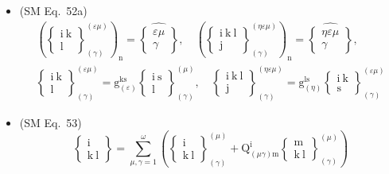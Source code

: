 \documentclass[
    12pt,              %
    a4paper,           %
    headings=normal,   %
    twoside=true,      %
    BCOR=8mm,          %
]{scrbook}
\begin{document}
\begin{itemize}[label={},leftmargin=0pt]
    \item (SM Eq.\ 52a) 
    \[
    \begin{gathered}
    \left( \left\{ \begin{smallmatrix} \mathrm{i\ k} \\ \mathrm{l} \end{smallmatrix} \right\}^{(\varepsilon\mu)}_{(\gamma)} \right)_\mathrm{n} = \widehat{\left\{ \begin{smallmatrix} \varepsilon\mu \\ \gamma \end{smallmatrix} \right\}}, \quad \left( \left\{ \begin{smallmatrix} \mathrm{i\ k\ l} \\ \mathrm{j} \end{smallmatrix} \right\}^{(\eta\varepsilon\mu)}_{(\gamma)} \right)_\mathrm{n} = \widehat{\left\{ \begin{smallmatrix} \eta\varepsilon\mu \\ \gamma \end{smallmatrix} \right\}}, \\
    \left\{ \begin{smallmatrix} \mathrm{i\ k} \\ \mathrm{l} \end{smallmatrix} \right\}^{(\varepsilon\mu)}_{(\gamma)} = \mathrm{g}_{(\varepsilon)}^{\mathrm{ks}}\left\{ \begin{smallmatrix} \mathrm{i\ s} \\ \mathrm{l} \end{smallmatrix} \right\}^{(\mu)}_{(\gamma)}, \quad \left\{ \begin{smallmatrix} \mathrm{i\ k\ l} \\ \mathrm{j} \end{smallmatrix} \right\}^{(\eta\varepsilon\mu)}_{(\gamma)} = \mathrm{g}_{(\eta)}^{\mathrm{ls}}\left\{ \begin{smallmatrix} \mathrm{i\ k} \\ \mathrm{s} \end{smallmatrix} \right\}^{(\varepsilon\mu)}_{(\gamma)}
    \end{gathered}
    \]

    \item (SM Eq.\ 53) 
    \[
    \left\{ \begin{smallmatrix} \mathrm{i} \\ \mathrm{k\ l} \end{smallmatrix} \right\} = \sum_{\mu,\gamma=1}^\omega \left( \left\{ \begin{smallmatrix} \mathrm{i} \\ \mathrm{k\ l} \end{smallmatrix} \right\}^{(\mu)}_{(\gamma)} + \mathrm{Q}^\mathrm{i}_{(\mu\gamma)\mathrm{m}} \left\{ \begin{smallmatrix} \mathrm{m} \\ \mathrm{k\ l} \end{smallmatrix} \right\}^{(\mu)}_{(\gamma)} \right)
    \]


\end{itemize}
\end{document}
